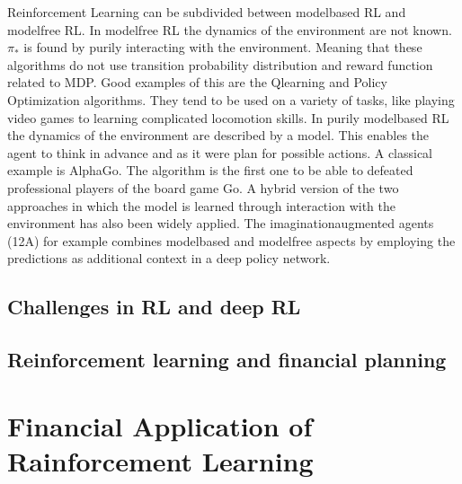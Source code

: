 \documentclass[letterpaper,10pt,english]{jupyterBook}
\begin{document}
\sphinxAtStartPar
{}

\sphinxAtStartPar
Reinforcement Learning can be subdivided between model\sphinxhyphen{}based RL and model\sphinxhyphen{}free RL. In model\sphinxhyphen{}free RL the dynamics of the environment are not known. \(\pi_*\) is found by purily interacting with the environment. Meaning that these algorithms do not use transition probability distribution and reward function related to MDP. Good examples of this are the Q\sphinxhyphen{}learning and Policy Optimization algorithms. They tend to be used on a variety of tasks, like playing video games to learning complicated locomotion skills. In purily model\sphinxhyphen{}based RL the dynamics of the environment are described by a model. This enables the agent to think in advance and as it were plan for possible actions. A classical example is AlphaGo. The algorithm is the first one to be able to defeated professional players of the board game Go. A hybrid version of the two approaches in which the model is learned through interaction with the environment has also been widely applied. The imagination\sphinxhyphen{}augmented agents (12A) for example combines model\sphinxhyphen{}based and model\sphinxhyphen{}free aspects by employing the predictions as additional context in a deep policy network.

\sphinxAtStartPar
{}

\sphinxAtStartPar
{}


\section{Challenges in RL and deep RL}
\label{\detokenize{Reinforcement_learning:challenges-in-rl-and-deep-rl}}

\section{Reinforcement learning and financial planning}
\label{\detokenize{Reinforcement_learning:reinforcement-learning-and-financial-planning}}

\chapter{Financial Application of Rainforcement Learning}
\label{\detokenize{Financial_application:financial-application-of-rainforcement-learning}}\label{\detokenize{Financial_application::doc}}
\end{document}
